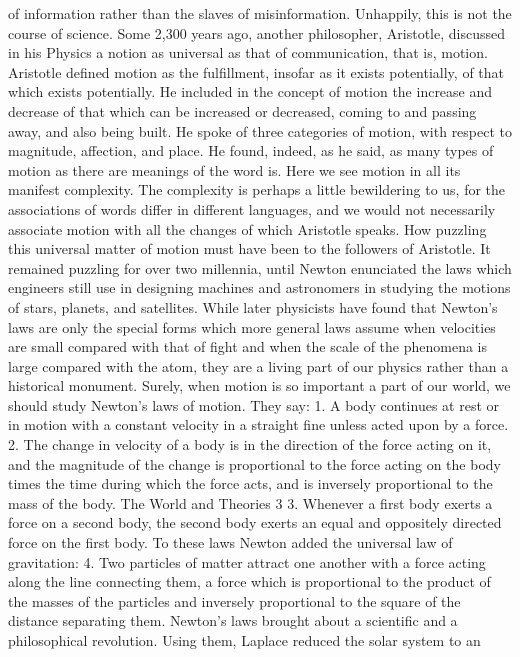 of information rather than the slaves of misinformation.
Unhappily, this is not the course of science. Some 2,300 years
ago, another philosopher, Aristotle, discussed in his Physics a
notion as universal as that of communication, that is, motion.
Aristotle defined motion as the fulfillment, insofar as it exists
potentially, of that which exists potentially. He included in the
concept of motion the increase and decrease of that which can be
increased or decreased, coming to and passing away, and also being
built. He spoke of three categories of motion, with respect to
magnitude, affection, and place. He found, indeed, as he said, as
many types of motion as there are meanings of the word is.
Here we see motion in all its manifest complexity. The complexity
is perhaps a little bewildering to us, for the associations of
words differ in different languages, and we would not necessarily
associate motion with all the changes of which Aristotle speaks.
How puzzling this universal matter of motion must have been
to the followers of Aristotle. It remained puzzling for over two
millennia, until Newton enunciated the laws which engineers still
use in designing machines and astronomers in studying the motions
of stars, planets, and satellites. While later physicists have found
that Newton’s laws are only the special forms which more general
laws assume when velocities are small compared with that of fight
and when the scale of the phenomena is large compared with the
atom, they are a living part of our physics rather than a historical
monument. Surely, when motion is so important a part of our
world, we should study Newton’s laws of motion. They say:
1. A body continues at rest or in motion with a constant velocity
in a straight fine unless acted upon by a force.
2. The change in velocity of a body is in the direction of the force
acting on it, and the magnitude of the change is proportional to
the force acting on the body times the time during which the force
acts, and is inversely proportional to the mass of the body.
The World and Theories 3
3. Whenever a first body exerts a force on a second body, the
second body exerts an equal and oppositely directed force on the
first body.
To these laws Newton added the universal law of gravitation:
4. Two particles of matter attract one another with a force acting
along the line connecting them, a force which is proportional
to the product of the masses of the particles and inversely proportional
to the square of the distance separating them.
Newton’s laws brought about a scientific and a philosophical
revolution. Using them, Laplace reduced the solar system to an
